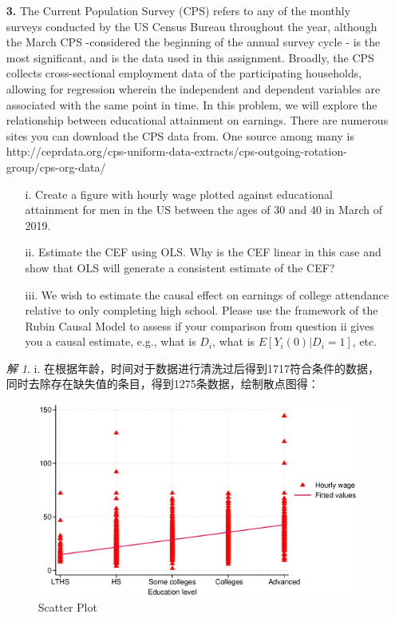 \documentclass[a4paper]{ctexart}
\theoremstyle{remark}
\newtheorem*{solution}{解}
\begin{document}
\begin{itemize}
\item[\textbf{3.}] The Current Population Survey (CPS) refers to any of the monthly surveys conducted by the US Census Bureau throughout the year, although the March CPS -considered the beginning of the annual survey cycle - is the most significant, and is the data used in this assignment. Broadly, the CPS collects cross-sectional employment data of the participating households, allowing for regression wherein the independent and dependent variables are associated with the same point in time. In this problem, we will explore the relationship between educational attainment on earnings. There are numerous sites you can download the CPS data from. One source among many is http://ceprdata.org/cps-uniform-data-extracts/cps-outgoing-rotation-group/cps-org-data/
\begin{enumerate}
\item[i.] Create a figure with hourly wage plotted against educational attainment for men in the US between the ages of 30 and 40 in March of 2019.
\item[ii.]  Estimate the CEF using OLS. Why is the CEF linear in this case and show that OLS will generate a consistent estimate of the CEF?
\item[iii.]  We wish to estimate the causal effect on earnings of college attendance relative to only completing high school. Please use the framework of the Rubin Causal Model to assess if your comparison from question ii gives you a causal estimate, e.g., what is $D_i$, what is $E[Y_i(0)|D_i = 1]$, etc.
\end{enumerate}

\begin{solution}
    i.  在根据年龄，时间对于数据进行清洗过后得到1717符合条件的数据，同时去除存在缺失值的条目，得到1275条数据，绘制散点图得：%
    \begin{figure}[htbp] %
        \centering
        \includegraphics[scale=0.5]{Scatter plot in us 3.1.eps} %
        \caption{Scatter Plot}
    \end{figure}



\end{solution}
\end{itemize}
\end{document}
